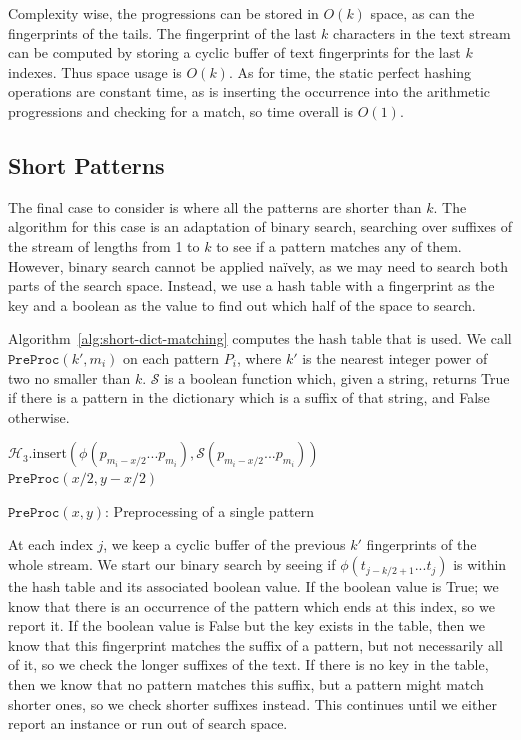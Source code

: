 \documentclass[ %
                    author={Dominic Joseph Moylett},
                    degree={MEng},
                     title={Dictionary Matching with Fingerprints},
                  subtitle={An Empirical Analysis},
                      type={research},
                      year={2015} ]{dissertation}
\begin{document}
Complexity wise, the progressions can be stored in $O(k)$ space, as can the fingerprints of the tails. The fingerprint of the last $k$ characters in the text stream can be computed by storing a cyclic buffer of text fingerprints for the last $k$ indexes. Thus space usage is $O(k)$. As for time, the static perfect hashing operations are constant time, as is inserting the occurrence into the arithmetic progressions and checking for a match, so time overall is $O(1)$.

\subsection{Short Patterns}
\label{ssec:short-theory}

The final case to consider is where all the patterns are shorter than $k$. The algorithm for this case is an adaptation of binary search, searching over suffixes of the stream of lengths from 1 to $k$ to see if a pattern matches any of them. However, binary search cannot be applied na\"{i}vely, as we may need to search both parts of the search space. Instead, we use a hash table with a fingerprint as the key and a boolean as the value to find out which half of the space to search.

Algorithm~\ref{alg:short-dict-matching} computes the hash table that is used. We call $\texttt{PreProc}(k',m_i)$ on each pattern $P_i$, where $k'$ is the nearest integer power of two no smaller than $k$. $\mathcal{S}$ is a boolean function which, given a string, returns True if there is a pattern in the dictionary which is a suffix of that string, and False otherwise.

\begin{algorithm}[t]
 {
  $\mathcal{H}_3.\text{insert}(\phi(p_{m_i-x/2}...p_{m_i}), \mathcal{S}(p_{m_i-x/2}...p_{m_i}))$\\
  $\texttt{PreProc}(x/2,y - x/2)$
}
\caption{$\texttt{PreProc}(x,y)$: Preprocessing of a single pattern}
\label{alg:short-dict-matching}
\end{algorithm}

At each index $j$, we keep a cyclic buffer of the previous $k'$ fingerprints of the whole stream. We start our binary search by seeing if $\phi(t_{j - k/2 + 1}...t_j)$ is within the hash table and its associated boolean value. If the boolean value is True; we know that there is an occurrence of the pattern which ends at this index, so we report it. If the boolean value is False but the key exists in the table, then we know that this fingerprint matches the suffix of a pattern, but not necessarily all of it, so we check the longer suffixes of the text. If there is no key in the table, then we know that no pattern matches this suffix, but a pattern might match shorter ones, so we check shorter suffixes instead. This continues until we either report an instance or run out of search space.
\end{document}
